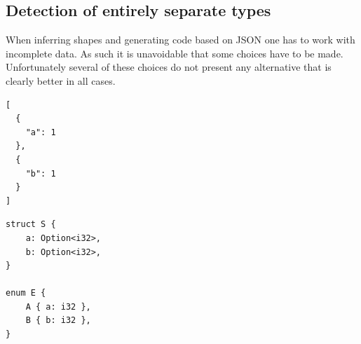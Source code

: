 
\subsection{Detection of entirely separate types}

When inferring shapes and generating code based on JSON one has to work with incomplete data. As such it is unavoidable that some choices have to be made. Unfortunately several of these choices do not present any alternative that is clearly better in all cases.

\begin{listing}[ht!]
\begin{verbatim}
[
  {
    "a": 1
  },
  {
    "b": 1
  }
]
\end{verbatim}
\caption{JSON Dilemma \#1}
\label{lst:json-dilemma-1}
\end{listing}

\begin{listing}[ht!]
\begin{verbatim}
struct S {
    a: Option<i32>,
    b: Option<i32>,
}

enum E {
    A { a: i32 },
    B { b: i32 },
}
\end{verbatim}
\caption{JSON Dilemma \#1 - Two solutions}
\label{lst:json-dilemma-1-rs}
\end{listing}
